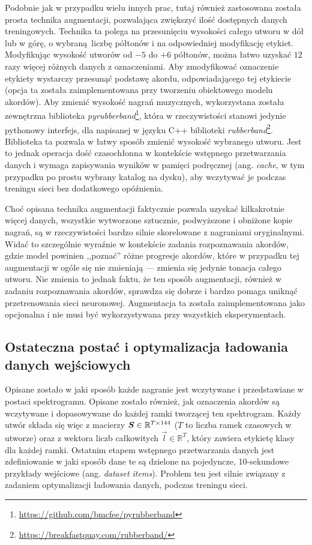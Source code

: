 Podobnie jak w przypadku wielu innych prac, tutaj również zastosowana została prosta technika
augmentacji, pozwalająca zwiększyć ilość dostępnych danych treningowych. Technika ta polega na
przesunięciu wysokości całego utworu w dół lub w górę, o wybraną liczbę półtonów i na odpowiedniej
modyfikację etykiet. Modyfikując wysokość utworów od $-5$ do $+6$ półtonów, można łatwo uzyskać $12$
razy więcej różnych danych z oznaczeniami. Aby zmodyfikować oznaczenie etykiety wystarczy przesunąć
podstawę akordu, odpowiadającego tej etykiecie (opcja ta została zaimplementowana przy tworzeniu
obiektowego modelu akordów). Aby zmienić wysokość nagrań muzycznych, wykorzystana została zewnętrzna
biblioteka \emph{pyrubberband}\footnote{\url{https://github.com/bmcfee/pyrubberband}}, która w
rzeczywistości stanowi jedynie pythonowy interfejs, dla napisanej w języku C++ biblioteki
\emph{rubberband}\footnote{\url{https://breakfastquay.com/rubberband/}}. Biblioteka ta pozwala w łatwy
sposób zmienić wysokość wybranego utworu. Jest to jednak operacja dość czasochłonna w kontekście
wstępnego przetwarzania danych i wymaga zapisywania wyników w pamięci podręcznej (ang. \emph{cache},
w tym przypadku po prostu wybrany katalog na dysku), aby wczytywać je podczas treningu sieci bez
dodatkowego opóźnienia.

Choć opisana technika augmentacji faktycznie pozwala uzyskać kilkakrotnie więcej danych, wszystkie
wytworzone sztucznie, podwyższone i obniżone kopie nagrań, są w rzeczywistości bardzo silnie
skorelowane z nagraniami oryginalnymi. Widać to szczególnie wyraźnie w kontekście zadania
rozpoznawania akordów, gdzie model powinien ,,poznać'' różne progresje akordów, które w przypadku
tej augmentacji w ogóle się nie zmieniają --- zmienia się jedynie tonacja całego utworu. Nie zmienia
to jednak faktu, że ten sposób augmentacji, również w zadaniu rozpoznawania akordów, sprawdza się
dobrze i bardzo pomaga uniknąć przetrenowania sieci neuronowej. Augmentacja ta została
zaimplementowana jako opcjonalna i nie musi być wykorzystywana przy wszystkich eksperymentach.

\subsection{Ostateczna postać i optymalizacja ładowania danych wejściowych}

Opisane zostało w jaki sposób każde nagranie jest wczytywane i przedstawiane w postaci spektrogramu.
Opisane zostało również, jak oznaczenia akordów są wczytywane i dopasowywane do każdej ramki
tworzącej ten spektrogram. Każdy utwór składa się więc z macierzy $\boldsymbol{S} \in \mathbb{R}^{T \times 144}$ ($T$ to
liczba ramek czasowych w utworze) oraz z wektora liczb całkowitych $\vec l \in \mathbb{R}^T$, który
zawiera etykietę klasy dla każdej ramki. Ostatnim etapem wstępnego przetwarzania danych jest
zdefiniowanie w jaki sposób dane te są dzielone na pojedyncze, 10-sekundowe przykłady wejściowe
(ang. \emph{dataset items}). Problem ten jest silnie związany z zadaniem optymalizacji ładowania
danych, podczas treningu sieci.

